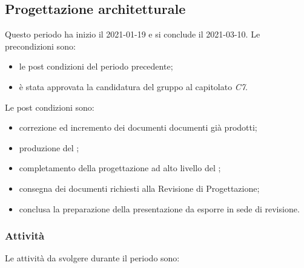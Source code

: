 \newpage
\subsection{Progettazione architetturale}
Questo periodo ha inizio il 2021-01-19 e si conclude il 2021-03-10.
Le precondizioni sono:
\begin{itemize}
	\item le post condizioni del periodo precedente;
	\item è stata approvata la candidatura del gruppo al capitolato \textit{C7}.
\end{itemize}
Le post condizioni sono:
\begin{itemize}
	\item correzione ed incremento dei documenti documenti già prodotti;
	\item produzione del ;
	\item completamento della progettazione ad alto livello del ;
	\item consegna dei documenti richiesti alla Revisione di Progettazione; 	
	\item conclusa la preparazione della presentazione da esporre in sede di revisione.
\end{itemize}
\subsubsection{Attività}
Le attività da svolgere durante il periodo sono:
